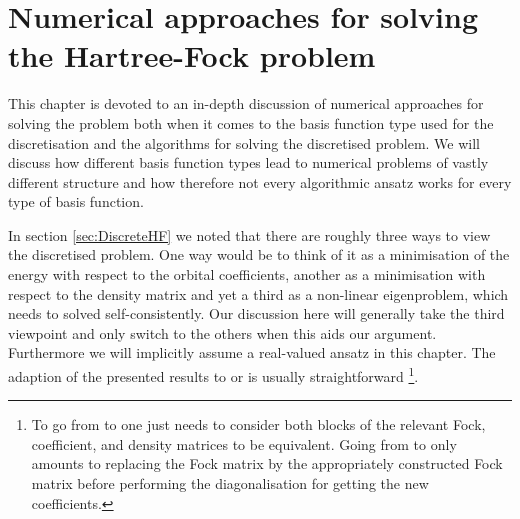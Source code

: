 \chapter{Numerical approaches for solving the Hartree-Fock problem}
\label{ch:NumSolveHF}

This chapter is devoted to an in-depth discussion of
numerical approaches for solving the \HF problem
both when it comes to the basis function type used for the discretisation
and the algorithms for solving the discretised problem.
We will discuss how different basis function types
lead to numerical problems of vastly different structure
and how therefore not every algorithmic ansatz works
for every type of basis function.

In section \ref{sec:DiscreteHF} we noted that there are
roughly three ways to view the discretised \HF problem.
One way would be to think of it as a minimisation of the energy
with respect to the orbital coefficients,
another as a minimisation with respect to the density matrix
and yet a third as a non-linear eigenproblem,
which needs to solved self-consistently.
Our discussion here will generally take the third viewpoint
and only switch to the others when this aids our argument.
Furthermore we will implicitly assume a real-valued
\UHF ansatz in this chapter.
The adaption of the presented results to
\RHF or \ROHF is usually straightforward%
\footnote{
To go from \UHF to \RHF one just needs to consider both blocks of the relevant
Fock, coefficient, and density matrices to be equivalent.
Going from \UHF to \ROHF only amounts to replacing the \UHF Fock matrix
by the appropriately constructed \ROHF Fock matrix before performing
the diagonalisation for getting the new coefficients.
}.






